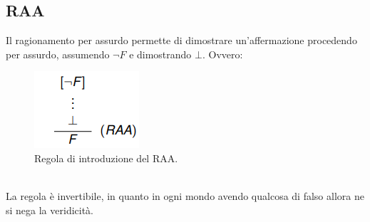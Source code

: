 \documentclass[12pt]{article}
\begin{document}
\subsection{RAA}
\label{ssec:RAA}
Il ragionamento per assurdo permette di dimostrare un'affermazione procedendo per assurdo, assumendo $\neg F$ e dimostrando $\bot$. Ovvero:
\begin{figure}[!htb]
    \centering
    \includegraphics[width=.9\linewidth,height=.2\textheight,keepaspectratio]{logica_proposizionale/introduzione/RAA.png} %
    \begin{center}
        \caption{\label{fig:RAA}Regola di introduzione del RAA.} %
    \end{center}
\end{figure}
\\
La regola è invertibile, in quanto in ogni mondo avendo qualcosa di falso allora ne si nega la veridicità.
\end{document}
